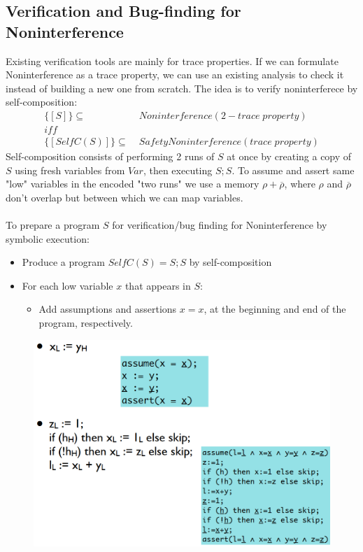 \documentclass[10pt,a4paper]{report}
\begin{document}
\subsection{Verification and Bug-finding for Noninterference}
Existing verification tools are mainly for trace properties. If we can formulate Noninterference as a trace property, we can use an existing analysis to check it instead of building a new one from scratch. The idea is to verify noninterferece by self-composition:
\begin{align}
\{[S]\} \subseteq&\; Noninterference(2-trace\;property)\\
iff&\\
\{[SelfC(S)]\} \subseteq&\; SafetyNoninterference(trace\;property)
\end{align}
Self-composition consists of performing 2 runs of $S$ at once by creating a copy of $S$ using fresh variables from $Var$, then executing $S;S$. To assume and assert same "low" variables in the encoded "two runs" we use a memory $\rho + \overline{\rho}$, where $\rho$ and $\overline{\rho}$ don’t overlap but between which we can map variables.\\
\\
To prepare a program $S$ for verification/bug finding for Noninterference by symbolic execution:
\begin{itemize}
\item Produce a program $SelfC(S)=S;S$ by self-composition
\item For each low variable $x$ that appears in $S$:
\begin{itemize}
\item Add assumptions and assertions $x=x$, at the beginning and end of the program, respectively.
\end{itemize}
\end{itemize}
\begin{figure}[H]
\centering
\includegraphics[scale=0.4]{39.png}
\end{figure}
\end{document}
